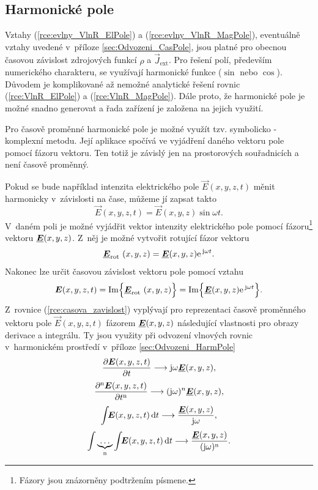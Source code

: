 \subsection{Harmonické pole}
Vztahy (\ref{rce:evlny_VlnR_ElPole}) a (\ref{rce:evlny_VlnR_MagPole}), eventuálně vztahy uvedené v~příloze \ref{sec:Odvozeni_CasPole}, jsou platné pro obecnou časovou závislost zdrojových funkcí $\rho$ a $\vec J_{\mathrm{ext}}$. Pro řešení polí, především numerického charakteru, se využívají harmonické funkce ($\sin$ nebo $\cos$). Důvodem je komplikované až nemožné analytické řešení rovnic (\ref{rce:VlnR_ElPole}) a (\ref{rce:VlnR_MagPole}). Dále proto, že harmonické pole je možné snadno generovat a řada zařízení je založena na jejich využití. 

Pro časově proměnné harmonické pole je možné využít tzv. symbolicko - komplexní metodu. Její aplikace spočívá ve vyjádření daného vektoru pole pomocí fázoru vektoru. Ten totiž je závislý jen na prostorových souřadnicích a není časově proměnný.

Pokud se bude například intenzita elektrického pole $\vec E(x,y,z,t)$ měnit harmonicky v~závislosti na čase, můžeme jí zapsat takto
\begin{displaymath}
	\vec E(x,y,z,t) = \vec E(x,y,z)\sin\omega t.
\end{displaymath}
V~daném poli je možné vyjádřit vektor intenzity elektrického pole pomocí fázoru\footnote{Fázory jsou znázorněny podtržením písmene.} vektoru $\mbox{\underline{\boldmath$E$}}(x,y,z)$. Z~něj je možné vytvořit rotující fázor vektoru
\begin{equation}
	\mbox{\underline{\boldmath$E$}}_{\mathrm{rot}\ }(x,y,z) = \mbox{\underline{\boldmath$E$}}(x,y,z)\mathrm{e\,}^{\mathrm{j}\omega t}.
	\label{rce:rotujici_fazor_vektoru}
\end{equation}
Nakonec lze určit časovou závislost vektoru pole pomocí vztahu
\begin{equation}
	\mbox{\boldmath$E$}(x,y,z,t) = \mathrm{Im}\Big\{ \mbox{\underline{\boldmath$E$}}_{\mathrm{rot}\ }(x,y,z)\Big\} = \mathrm{Im}\Big\{ \mbox{\underline{\boldmath$E$}}(x,y,z)\mathrm{e\,}^{\mathrm{j}\omega t}\Big\}.
	\label{rce:casova_zavislost}
\end{equation}
Z~rovnice (\ref{rce:casova_zavislost}) vyplývají pro reprezentaci časově proměnného vektoru pole $\vec E(x,y,z,t)$ fázorem $\mbox{\underline{\boldmath$E$}}(x,y,z)$ následující vlastnosti pro obrazy derivace a integrálu. Ty jsou využity při odvození vlnových rovnic v~harmonickém prostředí v~příloze \ref{sec:Odvozeni_HarmPole}
\begin{displaymath}
	\frac{\partial \mbox{\boldmath$E$}(x,y,z,t)}{\partial t} \longrightarrow \mathrm{j}\omega \mbox{\underline{\boldmath$E$}}(x,y,z),
\end{displaymath}
\begin{displaymath}
	\frac{\partial^{\mathrm{n}} \mbox{\boldmath$E$}(x,y,z,t)}{\partial t^{\mathrm{n}}} \longrightarrow (\mathrm{j}\omega)^{n} \mbox{\underline{\boldmath$E$}}(x,y,z),
\end{displaymath}
\begin{displaymath}
	\int\!\!\mbox{\boldmath$E$}(x,y,z,t) \,\mathrm{d} t \longrightarrow \frac{\mbox{\underline{\boldmath$E$}}(x,y,z)}{\mathrm{j}\omega},
\end{displaymath}
\begin{displaymath}
	\int\underbrace{\ldots}_{\mathrm{n}}\int\!\!\mbox{\boldmath$E$}(x,y,z,t) \,\mathrm{d} t \longrightarrow \frac{\mbox{\underline{\boldmath$E$}}(x,y,z)}{(\mathrm{j}\omega)^{\mathrm{n}}}.
\end{displaymath}


